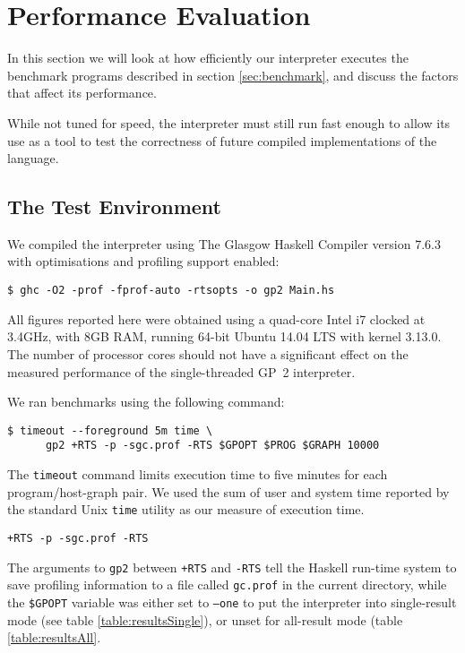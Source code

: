\section{Performance Evaluation}
\label{sec:performanceevaluation}

In this section we will look at how efficiently our interpreter executes the benchmark programs described in section \ref{sec:benchmark}, and discuss the factors that affect its performance.

While not tuned for speed, the interpreter must still run fast enough to allow its use as a tool to test the correctness of future compiled implementations of the language.




\subsection{The Test Environment}

We compiled the interpreter using The Glasgow Haskell Compiler version 7.6.3 with optimisations and profiling support enabled:

\begin{verbatim}
$ ghc -O2 -prof -fprof-auto -rtsopts -o gp2 Main.hs
\end{verbatim}

All figures reported here were obtained using a quad-core Intel i7 clocked at 3.4GHz, with 8GB RAM, running 64-bit Ubuntu 14.04 LTS with kernel 3.13.0. The number of processor cores should not have a significant effect on the measured performance of the single-threaded GP~2 interpreter.

We ran benchmarks using the following command:

\begin{verbatim}
$ timeout --foreground 5m time \
      gp2 +RTS -p -sgc.prof -RTS $GPOPT $PROG $GRAPH 10000
\end{verbatim}

The \texttt{timeout} command limits execution time to five minutes for each program/host-graph pair. We used the sum of user and system time reported by the standard Unix \texttt{time} utility as our measure of execution time.

\texttt{+RTS -p -sgc.prof -RTS} 

The arguments to \texttt{gp2} between \texttt{+RTS} and \texttt{-RTS} tell the Haskell run-time system to save profiling information to a file called \texttt{gc.prof} in the current directory, while the \texttt{\$GPOPT} variable was either set to \texttt{--one} to put the interpreter into single-result mode (see table \ref{table:resultsSingle}), or unset for all-result mode (table \ref{table:resultsAll}.

